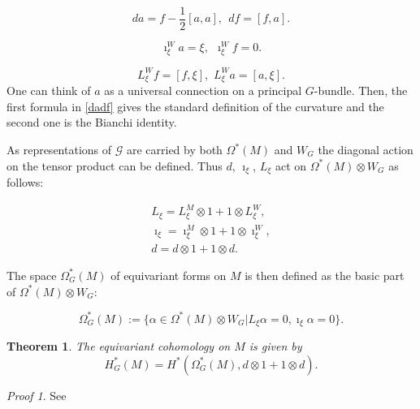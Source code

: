 \documentclass[11pt]{report}
\theoremstyle{plain}
\newtheorem{thm}{Theorem}[section]
\theoremstyle{definition}
\theoremstyle{remark}
\theoremstyle{remark}
\newtheorem*{pr}{Proof}
\numberwithin{equation}{section}
\begin{document}
%
\begin{equation} \label{dadf}
da = f - \frac{1}{2}[a, a], \  \ df = [f, a].
\end{equation}

\begin{equation}
\imath_\xi^W a = \xi, \  \  \imath_\xi^W f = 0.
\end{equation}

\begin{equation}
L_{\xi}^W f = [f, \xi], \,   \,   L_{\xi}^W a = [a, \xi].
\end{equation}
One can think of $a$ as a universal connection on a principal $G$-bundle. Then,  the first formula in \eqref{dadf} gives the standard definition of the curvature and the second one is the Bianchi identity. 

As representations of $\mathcal{G}$ are carried by both $\Omega^*(M)$ and $W_G$ the diagonal action on the tensor product can be defined.
Thus $d$, $\imath_\xi$, $L_\xi$ act on $\Omega^*(M) \otimes W_G$ as follows:

%
\begin{equation}
\begin{split}
L_{\xi} = L_{\xi}^M \otimes 1 + 1 \otimes L_{\xi}^W, \\
\imath_{\xi} = \imath_{\xi}^M \otimes 1 + 1 \otimes \imath_{\xi}^W, \\
d = d \otimes 1 + 1 \otimes d.
\end{split}
\end{equation}

The space $\Omega^*_G (M)$ of equivariant forms on $M$  is then defined as the basic part of $\Omega^*(M) \otimes W_G$:

%
$$ \Omega^*_G (M) :=\{ \alpha \in \Omega^*(M) \otimes W_G | L_{\xi} \alpha = 0, \imath_\xi \alpha = 0 \}. $$


\begin{thm}\label{Weil}
The equivariant cohomology on $M$ is given by
\begin{equation}
H^*_G(M)  = H^*( \Omega_G ^* (M), d\otimes 1 + 1\otimes d).
\end{equation}

\end{thm}
\begin{pr}
See \cite{Super}
\end{pr}
\end{document}
